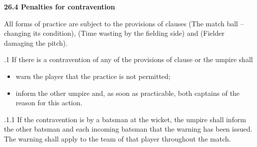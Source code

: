 \documentclass[12pt]{article}
\begin{document}
\vspace{\baselineskip}
{\fontsize{11pt}{13.2pt}\selectfont \textbf{26.4 \tabto{0.47in} Penalties for contravention}\par}\par


\vspace{\baselineskip}
\begin{adjustwidth}{0.0in}{0.35in}
{\fontsize{9pt}{10.8pt}\selectfont All forms of practice are subject to the provisions of clauses (The match ball – changing its condition),  (Time wasting by the fielding side) and (Fielder damaging the pitch).\par}\par

\end{adjustwidth}


\vspace{\baselineskip}
{\fontsize{9pt}{10.8pt}.1 \tabto{0.49in} If there is a contravention of any of the provisions of clause or the umpire shall\par}\par


\vspace{\baselineskip}
\begin{itemize}
	\item {\fontsize{9pt}{10.8pt}\selectfont warn the player that the practice is not permitted;\par}\par


\vspace{\baselineskip}
	\item {\fontsize{9pt}{10.8pt}\selectfont inform the other umpire and, as soon as practicable, both captains of the reason for this action.\par}
\end{itemize}\par


\vspace{\baselineskip}
\begin{adjustwidth}{1.18in}{0.15in}
{\fontsize{9pt}{10.8pt}.1.1 \tabto{1.17in} If the contravention is by a batsman at the wicket, the umpire shall inform the other batsman and each incoming batsman that the warning has been issued. The warning shall apply to the team of that player throughout the match.\par}\par

\end{adjustwidth}
\end{document}
